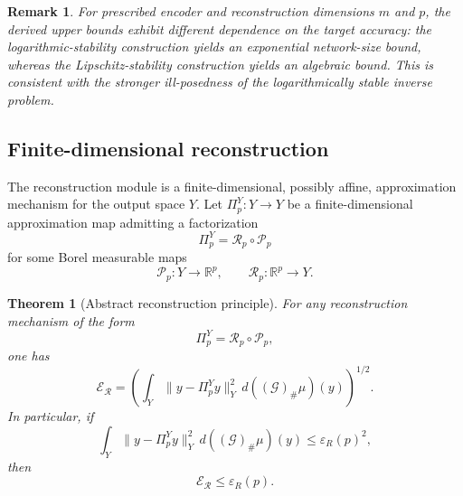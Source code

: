 \documentclass{article}
\numberwithin{equation}{section}
\theoremstyle{plain}
\newtheorem{theorem}{Theorem}[section]
\newtheorem{remark}{Remark}[section]
\begin{document}
	\begin{remark}
		For prescribed encoder and reconstruction dimensions $m$ and $p$, the derived upper bounds exhibit different dependence on the target accuracy: the logarithmic-stability construction yields an exponential network-size bound, whereas the Lipschitz-stability construction yields an algebraic bound. This is consistent with the stronger ill-posedness of the logarithmically stable inverse problem.
	\end{remark}
    
    \subsection{Finite-dimensional reconstruction}\label{subsec:reconstruction}
    
    The reconstruction module is a finite-dimensional, possibly affine, approximation mechanism for the output space $Y$.
    Let $\Pi_p^Y : Y \to Y$ be a finite-dimensional approximation map admitting a factorization
    \begin{equation*}
    \Pi_p^Y = \mathcal R_p \circ \mathcal P_p
    \end{equation*}
    for some Borel measurable maps
    \begin{equation*}
    \mathcal P_p : Y \to \mathbb{R}^p,
    \qquad
    \mathcal R_p : \mathbb{R}^p \to Y.
    \end{equation*}
    
    \begin{theorem}[Abstract reconstruction principle]
    	For any reconstruction mechanism of the form
    	\begin{equation*}
    	\Pi_p^Y = \mathcal R_p \circ \mathcal P_p,
    	\end{equation*}
    	one has
    	\begin{equation*}
    	\mathscr E_{\mathcal R}
    	=
    	\left(
    	\int_Y \|y-\Pi_p^Y y\|_Y^2\, d((\mathscr G)_\#\mu)(y)
    	\right)^{1/2}.
    	\end{equation*}
    	In particular, if
    	\begin{equation*}
    	\int_Y \|y-\Pi_p^Y y\|_Y^2\, d((\mathscr G)_\#\mu)(y)
    	\le \varepsilon_R(p)^2,
    	\end{equation*}
    	then
    	\begin{equation*}
    	\mathscr E_{\mathcal R}\le \varepsilon_R(p).
    	\end{equation*}
    \end{theorem}
    
\end{document}
